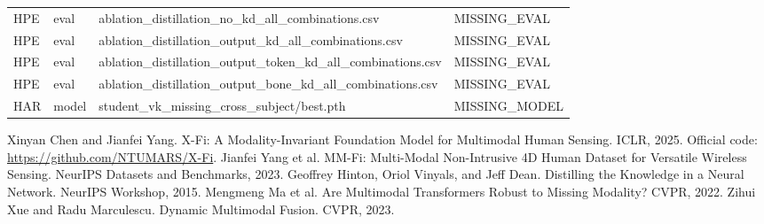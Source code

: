 \documentclass[UTF8,10pt,a4paper]{ctexart}
\begin{document}
{\begin{longtable}{llll}
HPE & eval & ablation\_distillation\_no\_kd\_all\_combinations.csv & MISSING\_EVAL\\
HPE & eval & ablation\_distillation\_output\_kd\_all\_combinations.csv & MISSING\_EVAL\\
HPE & eval & ablation\_distillation\_output\_token\_kd\_all\_combinations.csv & MISSING\_EVAL\\
HPE & eval & ablation\_distillation\_output\_bone\_kd\_all\_combinations.csv & MISSING\_EVAL\\
HAR & model & student\_vk\_missing\_cross\_subject/best.pth & MISSING\_MODEL\\
\bottomrule
\end{longtable}
}

\begin{thebibliography}{9}
 Xinyan Chen and Jianfei Yang. X-Fi: A Modality-Invariant Foundation Model for Multimodal Human Sensing. ICLR, 2025. Official code: \url{https://github.com/NTUMARS/X-Fi}.
 Jianfei Yang et al. MM-Fi: Multi-Modal Non-Intrusive 4D Human Dataset for Versatile Wireless Sensing. NeurIPS Datasets and Benchmarks, 2023.
 Geoffrey Hinton, Oriol Vinyals, and Jeff Dean. Distilling the Knowledge in a Neural Network. NeurIPS Workshop, 2015.
 Mengmeng Ma et al. Are Multimodal Transformers Robust to Missing Modality? CVPR, 2022.
 Zihui Xue and Radu Marculescu. Dynamic Multimodal Fusion. CVPR, 2023.
\end{thebibliography}
\end{document}
